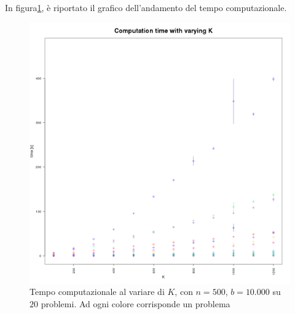 In figura\ref{fig:var_k}, è riportato il grafico dell'andamento del tempo
computazionale.

\begin{figure}[!h]
  \centering
  \includegraphics[width=12cm]{./imgs/variation_K.png}
  \caption{Tempo computazionale al variare di $K$, con $n = 500$, $b = 10.000$
  su $20$ problemi. Ad ogni colore corrisponde un problema}
  \label{fig:var_k}
\end{figure}
